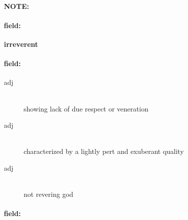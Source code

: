 \documentclass[12pt]{article}
\newenvironment{note}{\paragraph{NOTE:}}{}
\newenvironment{field}{\paragraph{field:}}{}
\begin{document}
\begin{note}
\begin{field}
\textbf{\large irreverent}
\end{field}


\begin{field}
\begin{description}
\item[adj] \hfill \\ 
showing lack of due respect or veneration

\item[adj] \hfill \\ 
characterized by a lightly pert and exuberant quality

\item[adj] \hfill \\ 
not revering god

\end{description}
\end{field}

\begin{field}
\end{field}
\end{note}
\end{document}
